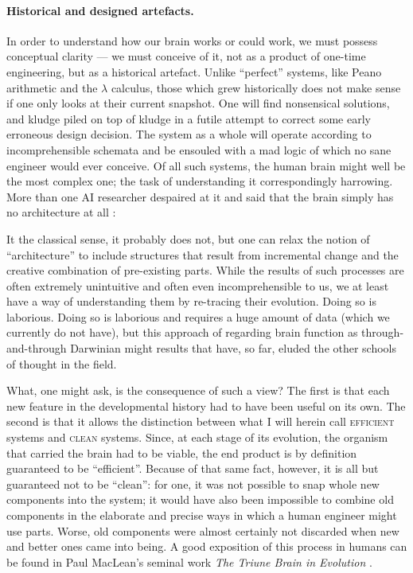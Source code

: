 \paragraph{Historical and designed artefacts.} In order to understand how our brain works or could work, we must possess conceptual clarity --- we must conceive of it, not as a product of one-time engineering, but as a historical artefact. Unlike ``perfect'' systems, like Peano arithmetic and the $\lambda$ calculus, those which grew historically does not make sense if one only looks at their current snapshot. One will find nonsensical solutions, and kludge piled on top of kludge in a futile attempt to correct some early erroneous design decision. The system as a whole will operate according to incomprehensible schemata and be ensouled with a mad logic of which no sane engineer would ever conceive. Of all such systems, the human brain might well be the most complex one; the task of understanding it correspondingly harrowing. More than one AI researcher despaired at it and said that the brain simply has no architecture at all \cite[p. ]{norvig}:

\begin{quotation}
\end{quotation}

It the classical sense, it probably does not, but one can relax the notion of ``architecture'' to include structures that result from incremental change and the creative combination of pre-existing parts. While the results of such processes are often extremely unintuitive and often even incomprehensible to us, we at least have a way of understanding them by re-tracing their evolution. Doing so is laborious. Doing so is laborious and requires a huge amount of data (which we currently do not have), but this approach of regarding brain function as through-and-through Darwinian might results that have, so far, eluded the other schools of thought in the field.

What, one might ask, is the consequence of such a view? The first is that each new feature in the developmental history had to have been useful on its own. The second is that it allows the distinction between what I will herein call \textsc{efficient} systems and \textsc{clean} systems. Since, at each stage of its evolution, the organism that carried the brain had to be viable, the end product is by definition guaranteed to be ``efficient''. Because of that same fact, however, it is all but guaranteed not to be ``clean'': for one, it was not possible to snap whole new components into the system; it would have also been impossible to combine old components in the elaborate and precise ways in which a human engineer might use parts. Worse, old components were almost certainly not discarded when new and better ones came into being. A good exposition of this process in humans can be found in Paul MacLean's seminal work {\em The Triune Brain in Evolution} \cite{maclean1990}.


